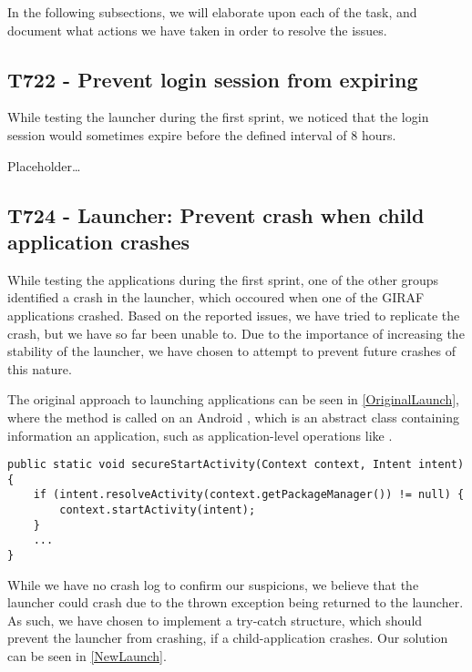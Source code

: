 In the following subsections, we will elaborate upon each of the task, and
document what actions we have taken in order to resolve the issues.

\subsection{T722 - Prevent login session from expiring}
While testing the launcher during the first sprint, we noticed that the login
session would sometimes expire before the defined interval of 8 hours.\nl

Placeholder\ldots

\subsection{T724 - Launcher: Prevent crash when child application crashes}
While testing the applications during the first sprint, one of the other groups
identified a crash in the launcher, which occoured when one of the GIRAF
applications crashed. Based on the reported issues, we have tried to
replicate the crash, but we have so far been unable to. Due to the importance of
increasing the stability of the launcher, we have chosen to attempt to prevent
future crashes of this nature.\nl

The original approach to launching applications can be seen in
\autoref{OriginalLaunch}, where the  method is called on an
Android , which is an abstract class containing information an
application, such as application-level operations like
.

\begin{minipage}[H]{\linewidth}
\begin{lstlisting}[caption = Original approach to launching applications., label = OriginalLaunch]
public static void secureStartActivity(Context context, Intent intent) {
	if (intent.resolveActivity(context.getPackageManager()) != null) {	
    	context.startActivity(intent);
	}
	...
}
\end{lstlisting}
\end{minipage}

While we have no crash log to confirm our suspicions, we believe that the
launcher could crash due to the thrown exception being returned to the launcher.
As such, we have chosen to implement a try-catch structure, which should prevent
the launcher from crashing, if a child-application crashes. Our solution can be 
seen in \autoref{NewLaunch}.\nl

